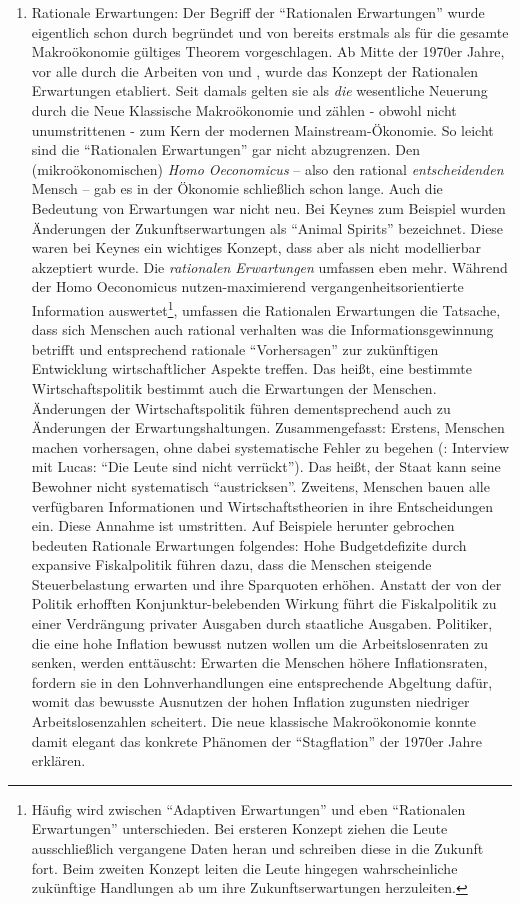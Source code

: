 \begin{enumerate}
	\item Rationale Erwartungen: Der Begriff der "`Rationalen Erwartungen"' wurde eigentlich schon durch \textcite{Muth1961} begründet und von \textcite{Lucas1972} bereits erstmals als für die gesamte Makroökonomie gültiges Theorem vorgeschlagen. Ab Mitte der 1970er Jahre, vor alle durch die Arbeiten von \textcite{Lucas1976} und \textcite{Sargent1975}, wurde das Konzept der Rationalen Erwartungen etabliert. Seit damals gelten sie als \textit{die} wesentliche Neuerung durch die Neue Klassische Makroökonomie und zählen - obwohl nicht unumstrittenen - zum Kern der modernen Mainstream-Ökonomie. So leicht sind die "`Rationalen Erwartungen"' gar nicht abzugrenzen. Den (mikroökonomischen) \textit{Homo Oeconomicus} -- also den rational \textit{entscheidenden} Mensch -- gab es in der Ökonomie schließlich schon lange. Auch die Bedeutung von Erwartungen war nicht neu. Bei Keynes zum Beispiel wurden Änderungen der Zukunftserwartungen als "`Animal Spirits"' bezeichnet. Diese waren bei Keynes ein wichtiges Konzept, dass aber als nicht modellierbar akzeptiert wurde. Die \textit{rationalen Erwartungen} umfassen eben mehr. Während der Homo Oeconomicus nutzen-maximierend vergangenheitsorientierte Information auswertet\footnote{Häufig wird zwischen "`Adaptiven Erwartungen"' und eben "`Rationalen Erwartungen"' unterschieden. Bei ersteren Konzept ziehen die Leute ausschließlich vergangene Daten heran und schreiben diese in die Zukunft fort. Beim zweiten Konzept leiten die Leute hingegen wahrscheinliche zukünftige Handlungen ab um ihre Zukunftserwartungen herzuleiten.}, umfassen die Rationalen Erwartungen die Tatsache, dass sich Menschen auch rational verhalten was die Informationsgewinnung betrifft und entsprechend rationale "`Vorhersagen"' zur zukünftigen Entwicklung wirtschaftlicher Aspekte treffen. Das heißt, eine bestimmte Wirtschaftspolitik bestimmt auch die Erwartungen der Menschen. Änderungen der Wirtschaftspolitik führen dementsprechend auch zu Änderungen der Erwartungshaltungen. Zusammengefasst: Erstens, Menschen machen vorhersagen, ohne dabei systematische Fehler zu begehen (\textcite{Lucas2013}: Interview mit Lucas: "`Die Leute sind nicht verrückt"'). Das heißt, der Staat kann seine Bewohner nicht systematisch "`austricksen"'. Zweitens, Menschen bauen alle verfügbaren Informationen und Wirtschaftstheorien in ihre Entscheidungen ein. Diese Annahme ist umstritten. Auf Beispiele herunter gebrochen bedeuten Rationale Erwartungen folgendes:
	Hohe Budgetdefizite durch expansive Fiskalpolitik führen dazu, dass die Menschen steigende Steuerbelastung erwarten und ihre Sparquoten erhöhen. Anstatt der von der Politik erhofften Konjunktur-belebenden Wirkung führt die Fiskalpolitik zu einer Verdrängung privater Ausgaben durch staatliche Ausgaben. Politiker, die eine hohe Inflation bewusst nutzen wollen um die Arbeitslosenraten zu senken, werden enttäuscht: Erwarten die Menschen höhere Inflationsraten, fordern sie in den Lohnverhandlungen eine entsprechende Abgeltung dafür, womit das bewusste Ausnutzen der hohen Inflation zugunsten niedriger Arbeitslosenzahlen scheitert. Die neue klassische Makroökonomie konnte damit elegant das konkrete Phänomen der "`Stagflation"' der 1970er Jahre erklären. 	 

\end{enumerate}
